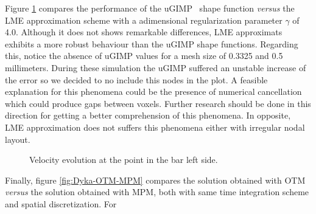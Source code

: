 Figure \ref{fig:Dyka-uGIMP-LME} compares the performance of the
uGIMP~\cite{Bardenhagen2004} shape function \textit{versus} the LME approximation scheme with
a adimensional regularization parameter $\gamma$ of 4.0. Although it
does not shows remarkable differences, LME approximats exhibits a more
robust behaviour than the uGIMP shape functions. Regarding this, notice
the absence of uGIMP values for a mesh size of 0.3325 and 0.5
millimeters. During these simulation the uGIMP suffered an unstable
increase of the error so we decided to no include this nodes in the
plot. A feasible explanation for this phenomena could be the presence
of numerical cancellation which could produce gaps between
voxels. Further research should be done in this direction for getting
a better comprehension of this phenomena. In opposite, LME
approximation does not suffers this phenomena either with irregular
nodal layout.
\begin{figure}\sidecaption
  \centering
  \caption{Velocity evolution at the point in the bar left side.}
  \label{fig:Dyka-uGIMP-LME}
\end{figure}
Finally, figure \ref{fig:Dyka-OTM-MPM} compares the solution obtained
with OTM~\cite{Li2010} \textit{versus} the solution obtained with MPM,
both with same time integration scheme and spatial discretization. For
